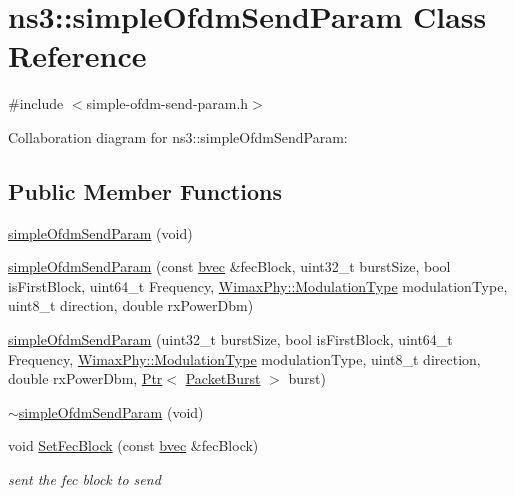 \hypertarget{classns3_1_1simpleOfdmSendParam}{}\section{ns3\+:\+:simple\+Ofdm\+Send\+Param Class Reference}
\label{classns3_1_1simpleOfdmSendParam}


{\ttfamily \#include $<$simple-\/ofdm-\/send-\/param.\+h$>$}



Collaboration diagram for ns3\+:\+:simple\+Ofdm\+Send\+Param\+:
\subsection*{Public Member Functions}
\begin{DoxyCompactItemize}
\item 
\hyperlink{classns3_1_1simpleOfdmSendParam_a898685a5cfd18164fa1f0b8909dd413b}{simple\+Ofdm\+Send\+Param} (void)
\item 
\hyperlink{classns3_1_1simpleOfdmSendParam_a195cc47b125f1bbd6d183b7d4285c044}{simple\+Ofdm\+Send\+Param} (const \hyperlink{namespacens3_a184f2682613716e1a24969b3e70b4242}{bvec} \&fec\+Block, uint32\+\_\+t burst\+Size, bool is\+First\+Block, uint64\+\_\+t Frequency, \hyperlink{classns3_1_1WimaxPhy_a044c5d8a48ca992c39c2a946f6e755fa}{Wimax\+Phy\+::\+Modulation\+Type} modulation\+Type, uint8\+\_\+t direction, double rx\+Power\+Dbm)
\item 
\hyperlink{classns3_1_1simpleOfdmSendParam_a0828e810e639f263c3e2db6a1c3deb70}{simple\+Ofdm\+Send\+Param} (uint32\+\_\+t burst\+Size, bool is\+First\+Block, uint64\+\_\+t Frequency, \hyperlink{classns3_1_1WimaxPhy_a044c5d8a48ca992c39c2a946f6e755fa}{Wimax\+Phy\+::\+Modulation\+Type} modulation\+Type, uint8\+\_\+t direction, double rx\+Power\+Dbm, \hyperlink{classns3_1_1Ptr}{Ptr}$<$ \hyperlink{classns3_1_1PacketBurst}{Packet\+Burst} $>$ burst)
\item 
\hyperlink{classns3_1_1simpleOfdmSendParam_afb298eff3560833ceb20bdfbc7da96be}{$\sim$simple\+Ofdm\+Send\+Param} (void)
\item 
void \hyperlink{classns3_1_1simpleOfdmSendParam_a45271ca9ac19a8cf00e29609877457e9}{Set\+Fec\+Block} (const \hyperlink{namespacens3_a184f2682613716e1a24969b3e70b4242}{bvec} \&fec\+Block)
\begin{DoxyCompactList}\small\item\em sent the fec block to send \end{DoxyCompactList}\item 

\end{DoxyCompactItemize}
